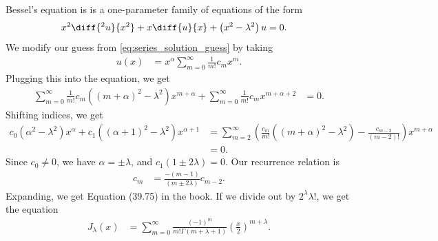 \documentclass[10pt]{mypackage}
\begin{document}
  \begin{example}
    Bessel's equation is is a one-parameter family of equations of the form
    \begin{align*}
      x^2\diff{^2u}{x^2} + x\diff{u}{x} + \left( x^2-\lambda^2 \right)u &= 0.
    \end{align*}
    We modify our guess from \eqref{eq:series_solution_guess} by taking
    \begin{align*}
      u(x) &= x^{\alpha}\sum_{m=0}^{\infty}\frac{1}{m!}c_mx^{m}.
    \end{align*}
    Plugging this into the equation, we get
    \begin{align*}
      \sum_{m=0}^{\infty}\frac{1}{m!}c_m\left( \left( m + \alpha \right)^2-\lambda^2 \right)x^{m + \alpha} + \sum_{m=0}^{\infty}\frac{1}{m!}c_mx^{m + \alpha + 2} &= 0.
    \end{align*}
    Shifting indices, we get
    \begin{align*}
      c_0\left( \alpha^2 -\lambda^2 \right)x^{\alpha} + c_1\left( \left( \alpha + 1 \right)^2-\lambda^2 \right)x^{\alpha + 1} &= \sum_{m=2}^{\infty}\left( \frac{c_m}{m!}\left( \left( m + \alpha \right)^2-\lambda^2 \right) - \frac{c_{m-2}}{\left( m-2 \right)!} \right)x^{m + \alpha}\\
                                                                                                                              &= 0.
    \end{align*}
    Since $c_0\neq 0$, we have $\alpha = \pm\lambda$, and $c_1  \left( 1 \pm 2\lambda \right)=  0$. Our recurrence relation is
    \begin{align*}
      c_m &= \frac{-\left( m-1 \right)}{\left( m\pm 2\lambda \right)}c_{m-2}.
    \end{align*}
    Expanding, we get Equation (39.75) in the book. If we divide out by $2^{\lambda}\lambda!$, we get the equation
    \begin{align*}
      J_{\lambda}\left( x \right) &= \sum_{m=0}^{\infty}\frac{\left( -1 \right)^{m}}{m!\Gamma\left( m + \lambda + 1 \right)} \left( \frac{x}{2} \right)^{m + \lambda}.
    \end{align*}
  \end{example}
\end{document}
